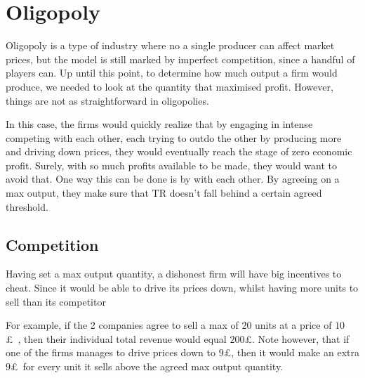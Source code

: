 \documentclass[english,course,draft]{Notes}
\begin{document}
\section{Oligopoly}


\par{Oligopoly is a type of industry where no a single producer can affect market prices, but the model is still marked by imperfect competition, since a handful of players can. Up until this point, to determine how much output a firm would produce, we needed to look at the quantity that maximised profit. However, things are not as straightforward in oligopolies.}




\par{In this case, the firms would quickly realize that by engaging in intense competing with each other, each trying to outdo the other by producing more and driving down prices, they would eventually reach the stage of zero economic profit. Surely, with so much profits available to be made, they would want to avoid that. One way this can be done is by  with each other. By agreeing on a max output, they make sure that TR doesn't fall behind a certain agreed threshold. }

\subsection{Competition}

\par{Having set a max output quantity, a dishonest firm will have big incentives to cheat. Since it would be able to drive its prices down, whilst having more units to sell than its competitor}

\par{For example, if the 2 companies agree to sell a max of $20$ units at a price of $10$\pounds \ , then their individual total revenue would equal $200$\pounds. Note however, that if one of the firms manages to drive prices down to $9$\pounds, then it would make an extra $9$\pounds \ for every unit it sells above the agreed max output quantity.}
\end{document}
